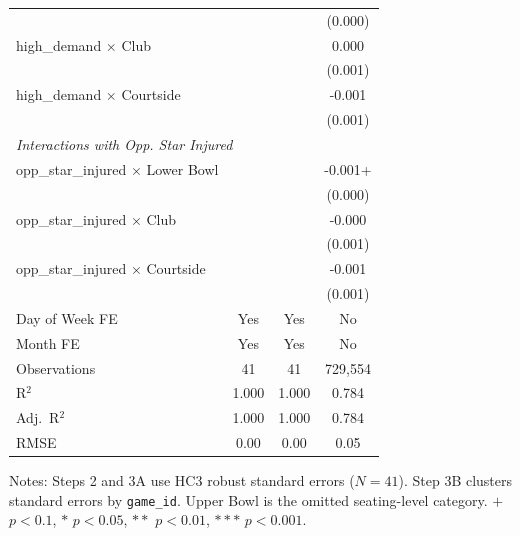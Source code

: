 \documentclass[12pt]{article}
\begin{document}
\begin{table}[h!]
\begin{tabular}{lccc}
                   &           &           &  (0.000)  \\
high\_demand $\times$ Club      &  &  &  0.000    \\
                   &           &           &  (0.001)  \\
high\_demand $\times$ Courtside &  &  & -0.001    \\
                   &           &           &  (0.001)  \\
\midrule
\multicolumn{4}{l}{\textit{Interactions with Opp. Star Injured}} \\
opp\_star\_injured $\times$ Lower Bowl & & & -0.001+  \\
                   &           &           &  (0.000)  \\
opp\_star\_injured $\times$ Club      & & & -0.000   \\
                   &           &           &  (0.001)  \\
opp\_star\_injured $\times$ Courtside & & & -0.001   \\
                   &           &           &  (0.001)  \\
\midrule
Day of Week FE     & Yes       & Yes       &  No       \\
Month FE           & Yes       & Yes       &  No       \\
\midrule
Observations       & 41        & 41        & 729,554   \\
R$^2$              & 1.000     & 1.000     &  0.784    \\
Adj.\ R$^2$        & 1.000     & 1.000     &  0.784    \\
RMSE               & 0.00      & 0.00      &  0.05     \\
\bottomrule
\end{tabular}
\begin{tablenotes}
\small
\item Notes: Steps 2 and 3A use HC3 robust standard errors ($N = 41$). Step 3B clusters standard errors by \texttt{game\_id}. Upper Bowl is the omitted seating-level category. $+$ $p < 0.1$, $*$ $p < 0.05$, $**$ $p < 0.01$, $***$ $p < 0.001$.
\end{tablenotes}
\end{table}
 
\end{document}
